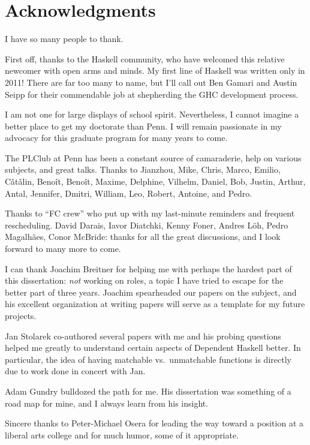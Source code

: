 \chapter*{Acknowledgments}

I have so many people to thank.

First off, thanks to the Haskell community, who have welcomed this
relative newcomer with open arms and minds. My first line of Haskell
was written only in 2011!
There are far too many
to name, but I'll call out Ben Gamari and Austin Seipp for their
commendable job at shepherding the GHC development process.

I am not one for large displays of school spirit. Nevertheless,
I cannot imagine a better place to get my doctorate than Penn.
I will remain passionate in my advocacy for this graduate program
for many years to come.

The PLClub at Penn has been a constant source of camaraderie, help
on various subjects, and great talks. Thanks to Jianzhou, Mike, Chris,
Marco, Emilio, C\v{a}t\v{a}lin, Beno\^{i}t, Beno\^{i}t, Maxime, Delphine,
Vilhelm, Daniel, Bob, Justin, Arthur, Antal, Jennifer, Dmitri, William,
Leo, Robert, Antoine, and Pedro.

Thanks to ``FC crew'' who put up with my last-minute reminders and
frequent rescheduling. David Darais, Iavor Diatchki, Kenny Foner,
 Andres L\"{o}h, Pedro Magalh\~{a}es, Conor McBride: thanks for all the great
discussions, and I look forward to many more to come.

I can thank Joachim Breitner for helping me with perhaps the hardest
part of this dissertation: \emph{not} working on roles, a topic I have
tried to escape for the better part of three years. Joachim spearheaded
our papers on the subject, and his excellent organization at writing papers
will serve as a template for my future projects.

Jan Stolarek co-authored several papers with me and his probing questions helped
me greatly to understand certain aspects of Dependent Haskell better. In particular,
the idea of having matchable vs.~unmatchable functions is directly due to work
done in concert with Jan.

Adam Gundry bulldozed the path for me. His dissertation was something of
a road map for mine, and I always learn from his insight.

Sincere thanks to Peter-Michael Osera for leading the way toward
a position at a liberal arts college and for much humor, some of
it appropriate.

